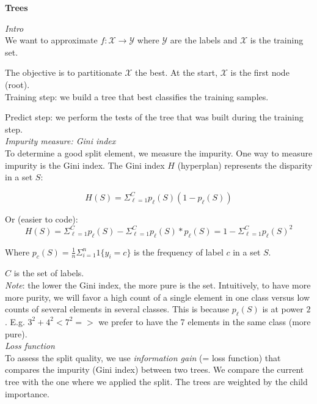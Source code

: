 {\fontsize{12pt}{22pt} \textbf{Trees}\par}

\vspace{5mm}

\textit{Intro} \\

We want to approximate $f: \mathcal{X} \to \mathcal{Y}$ where $\mathcal{Y}$ are the labels and $\mathcal{X}$ is the training set.

The objective is to partitionate $\mathcal{X}$ the best. At the start, $\mathcal{X}$ is the first node (root). \\

Training step: we build a tree that best classifies the training samples.

Predict step: we perform the tests of the tree that was built during the training step. \\

\textit{Impurity measure: Gini index} \\

To determine a good split element, we measure the impurity. One way to measure impurity is the Gini index. The Gini index $H$ (hyperplan) represents the disparity in a set $S$:

$$H(S)=\Sigma_{\ell=1}^C p_{\ell}(S)(1-p_{\ell}(S))$$

Or (easier to code): 
$$H(S)=\Sigma_{\ell=1}^C p_{\ell}(S)-\Sigma_{\ell=1}^C p_{\ell}(S)*p_{\ell}(S)=1-\Sigma_{\ell=1}^C p_{\ell}(S)^2$$

Where $p_{c}(S)=\frac{1}{n}\Sigma_{i=1}^n 1\{y_i=c\}$ is the frequency of label $c$ in a set $S$.

$C$ is the set of labels. \\

\textit{Note}: the lower the Gini index, the more pure is the set. Intuitively, to have more more purity, we will favor a high count of a single element in one class versus low counts of several elements in several classes. This is because $p_{\ell}(S)$ is at power $2$. E.g. $3^2 + 4^2 < 7^2 =>$ we prefer to have the 7 elements in the same class (more pure).\\

\textit{Loss function} \\

To assess the split quality, we use \textit{information gain} (= loss function) that compares the impurity (Gini index) between two trees. We compare the current tree with the one where we applied the split. The trees are weighted by the child importance.


